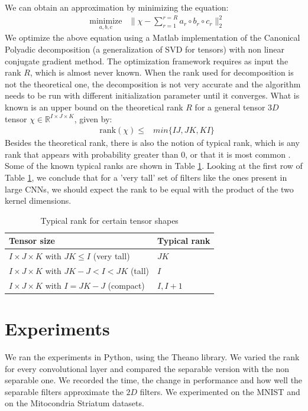 \documentclass{article} %
\begin{document}
We can obtain an approximation by minimizing the equation:
\begin{equation*}
\begin{aligned}
& \underset{a,b,c}{\text{minimize}}
& \| \chi - \sum_{r=1}^{r=R}{a_{r}\circ b_{r}\circ c_{r}} \|_{2}^{2} 
\end{aligned}
\end{equation*}
We optimize the above equation using a Matlab implementation of the Canonical Polyadic decomposition (a generalization of  SVD for tensors) with  non linear conjugate gradient method. The optimization framework requires as input the rank $R$, which is almost never known. When the rank used for decomposition is not the theoretical one, the decomposition is not very accurate and the algorithm needs to be run with different initialization parameter until it converges.
What is known is an upper bound on the theoretical rank $R$ for a  general tensor $3D$ tensor $\chi \in \mathbb{R}^{I\times J\times K}$, given by:
 \begin{equation*}
\begin{aligned}
& \text{rank}(\chi) \leq 
& min{\{IJ, JK, KI\}}
\end{aligned}
\end{equation*} 
Besides the theoretical rank, there is also the notion of typical rank, which is any rank
that appears with probability greater than 0, or that it is most common \cite{KoBa09}.
Some of the known typical ranks are shown in Table \ref{table:rank}.
Looking at the first row of Table \ref{table:rank}, we conclude that for a 'very tall' set of filters like the ones present in large CNNs, 
we should expect the rank to be equal with the product of the two kernel dimensions.
 \begin{table}
\centering
\begin{tabular}{@{}ll@{}}\toprule
Tensor size & Typical rank \\ \midrule
$I \times J \times K$ with $JK \leq I$ (very tall) & $JK$\\
$I \times J \times K$ with $JK - J < I < JK$ (tall) & $I$ \\
$I \times J \times K$ with $I = JK - J$ (compact) & $I, I+1$  \\ \bottomrule
\end{tabular}
\caption{Typical rank for certain tensor shapes}
\label{table:rank}
\end{table}

\section{Experiments}
We ran the experiments in Python, using the Theano library. 
We varied the rank for every convolutional layer and compared the separable version with the non separable one. We recorded the time, the change in performance and how well the separable filters approximate the $2D$ filters. We experimented on the MNIST and on the Mitocondria Striatum datasets.



\end{document}
